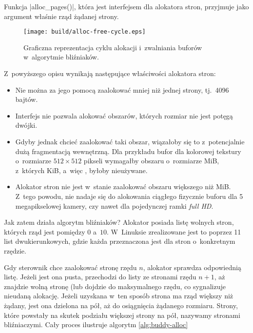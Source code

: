 Funkcja \code|alloc_pages()|, która jest interfejsem dla
alokatora stron, przyjmuje jako argument właśnie rząd żądanej strony.

\begin{wrapfigure}{o}[1.5cm]{0.3\textwidth}
\begin{center}
\texttt{[image: build/alloc-free-cycle.eps]}
\end{center}
\caption{Graficzna reprezentacja cyklu alokacji i~zwalniania buforów
  w~algorytmie bliźniaków.}
\end{wrapfigure}

Z~powyższego opisu wynikają następujące właściwości alokatora stron:

\begin{itemize}
\item Nie można za jego pomocą zaalokować mniej niż jednej strony,
  tj.\ 4096 bajtów.
\item Interfejs nie pozwala alokować obszarów, których rozmiar nie
  jest potęgą dwójki.
\item Gdyby jednak chcieć zaalokować taki obszar, wiązałoby się to
  z~potencjalnie dużą fragmentacją wewnętrzną.  Dla przykładu bufor
  dla kolorowej tekstury o~rozmiarze $512 \times 512$ pikseli
  wymagałby obszaru o~rozmiarze \unit[1]{MiB}, z~których
  \unit[256]{KiB}, a~więc , byłoby nieużywane.
\item Alokator stron nie jest w~stanie zaalokować obszaru większego
  niż \unit[4]{MiB}.  Z~tego powodu, nie nadaje się do alokowania
  ciągłego fizycznie buforu dla 5 megapikselowej kamery, czy nawet dla
  pojedynczej ramki {\it full HD}.
\end{itemize}

Jak zatem działa algorytm bliźniaków?  Alokator posiada listę wolnych
stron, których rząd jest pomiędzy $0$ a~$10$.  W~Linuksie zrealizowane
jest to poprzez 11 list dwukierunkowych, gdzie każda przeznaczona jest
dla stron o~konkretnym rzędzie.

Gdy sterownik chce zaalokować stronę rzędu $n$, alokator sprawdza
odpowiednią listę.  Jeżeli jest ona pusta, przechodzi do listy ze
stronami rzędu $n+1$, aż znajdzie wolną stronę (lub dojdzie do
maksymalnego rzędu, co sygnalizuje nieudaną alokację.  Jeżeli uzyskana
w~ten sposób strona ma rząd większy niż żądany, jest ona dzielona na
pół, aż do osiągnięcia żądanego rozmiaru.  Strony, które powstały na
skutek podziału większej strony na pół, nazywamy stronami
bliźniaczymi.  Cały proces ilustruje algorytm \ref{alg:buddy-alloc}


